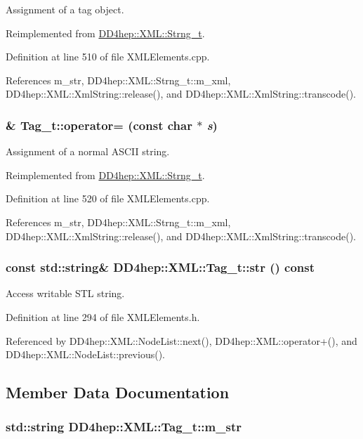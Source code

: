 Assignment of a tag object. 

Reimplemented from \hyperlink{class_d_d4hep_1_1_x_m_l_1_1_strng__t_a27581bce0d2c52f93ca9cf5151779c5d}{DD4hep::XML::Strng\_\-t}.

Definition at line 510 of file XMLElements.cpp.

References m\_\-str, DD4hep::XML::Strng\_\-t::m\_\-xml, DD4hep::XML::XmlString::release(), and DD4hep::XML::XmlString::transcode().\hypertarget{class_d_d4hep_1_1_x_m_l_1_1_tag__t_a170961001c2a13473b9258cd92a27faf}{
\subsubsection[{operator=}]{ \& Tag\_\-t::operator= (const char $\ast$ {\em s})}}
\label{class_d_d4hep_1_1_x_m_l_1_1_tag__t_a170961001c2a13473b9258cd92a27faf}


Assignment of a normal ASCII string. 

Reimplemented from \hyperlink{class_d_d4hep_1_1_x_m_l_1_1_strng__t_a787c32e2ab4f24fff13bb8b9a059ca3c}{DD4hep::XML::Strng\_\-t}.

Definition at line 520 of file XMLElements.cpp.

References m\_\-str, DD4hep::XML::Strng\_\-t::m\_\-xml, DD4hep::XML::XmlString::release(), and DD4hep::XML::XmlString::transcode().\hypertarget{class_d_d4hep_1_1_x_m_l_1_1_tag__t_a64c06a11bc70eadc254e6a8416648284}{
\subsubsection[{str}]{\setlength{\rightskip}{0pt plus 5cm}const std::string\& DD4hep::XML::Tag\_\-t::str () const}}
\label{class_d_d4hep_1_1_x_m_l_1_1_tag__t_a64c06a11bc70eadc254e6a8416648284}


Access writable STL string. 

Definition at line 294 of file XMLElements.h.

Referenced by DD4hep::XML::NodeList::next(), DD4hep::XML::operator+(), and DD4hep::XML::NodeList::previous().

\subsection{Member Data Documentation}
\hypertarget{class_d_d4hep_1_1_x_m_l_1_1_tag__t_aab9eff18240d6d98b8d8063792198e91}{
\subsubsection[{m\_\-str}]{\setlength{\rightskip}{0pt plus 5cm}std::string {\bf DD4hep::XML::Tag\_\-t::m\_\-str}}}
\label{class_d_d4hep_1_1_x_m_l_1_1_tag__t_aab9eff18240d6d98b8d8063792198e91}


